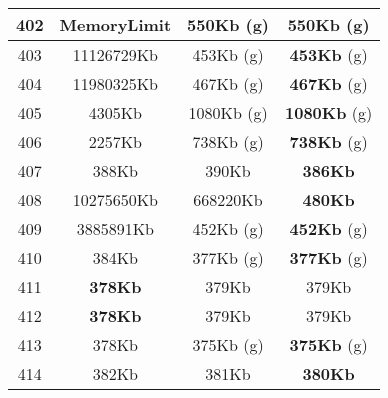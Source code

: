 \begin{table}[H]
\begin{minipage}{5cm}
{\begin{tabular}{|c|c|c|c|}
\hline
402 & \textbf{MemoryLimit} & 550Kb (g) & \textbf{550Kb} (g) \\
\hline
403 & 11126729Kb & 453Kb (g) & \textbf{453Kb} (g) \\
\hline
404 & 11980325Kb & 467Kb (g) & \textbf{467Kb} (g) \\
\hline
405 & 4305Kb & 1080Kb (g) & \textbf{1080Kb} (g) \\
\hline
406 & 2257Kb & 738Kb (g) & \textbf{738Kb} (g) \\
\hline
407 & 388Kb & 390Kb & \textbf{386Kb} \\
\hline
408 & 10275650Kb & 668220Kb & \textbf{480Kb} \\
\hline
409 & 3885891Kb & 452Kb (g) & \textbf{452Kb} (g) \\
\hline
410 & 384Kb & 377Kb (g) & \textbf{377Kb} (g) \\
\hline
411 & \textbf{378Kb} & 379Kb & 379Kb \\
\hline
412 & \textbf{378Kb} & 379Kb & 379Kb \\
\hline
413 & 378Kb & 375Kb (g) & \textbf{375Kb} (g) \\
\hline
414 & 382Kb & 381Kb & \textbf{380Kb} \\
\hline
\end{tabular}
}
\end{minipage}
\begin{minipage}{5cm} 
\end{minipage}
\end{table}
